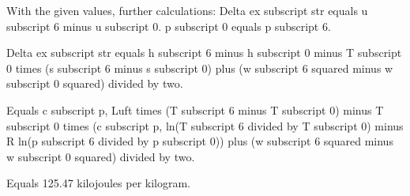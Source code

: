 With the given values, further calculations:  
Delta ex subscript str equals u subscript 6 minus u subscript 0.  
p subscript 0 equals p subscript 6.  

Delta ex subscript str equals h subscript 6 minus h subscript 0 minus T subscript 0 times (s subscript 6 minus s subscript 0) plus (w subscript 6 squared minus w subscript 0 squared) divided by two.  

Equals c subscript p, Luft times (T subscript 6 minus T subscript 0) minus T subscript 0 times (c subscript p, ln(T subscript 6 divided by T subscript 0) minus R ln(p subscript 6 divided by p subscript 0)) plus (w subscript 6 squared minus w subscript 0 squared) divided by two.  

Equals 125.47 kilojoules per kilogram.